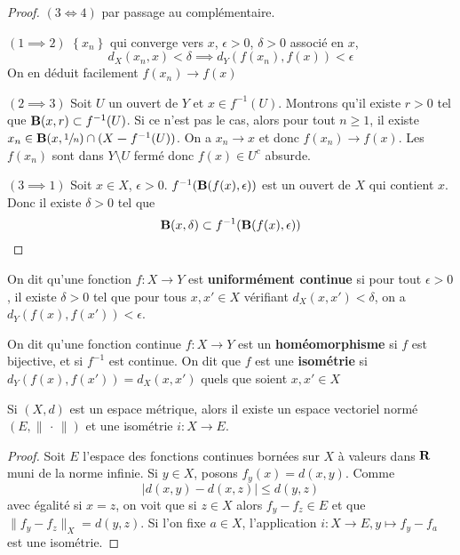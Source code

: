 \begin{proof}
    $(3 \iff  4)$ par passage au complémentaire.

    $(1 \implies 2)$  $ \left\{ x_n \right\} $ qui converge vers $x$,  $\epsilon>0$,  $\delta>0$ associé en  $x$,  \[
        d_X(x_n, x)<\delta \implies  d_Y(f(x_n), f(x))<\epsilon
    \] 
    On en déduit facilement $f(x_n)\longrightarrow f(x)$

    $(2 \implies 3)$ Soit $U$ un ouvert de  $Y$ et  $x \in  f^{-1}(U)$. Montrons qu'il existe $r>0$ tel que  $\mathbf B(x, r)\subset f^{-1}(U)$. Si ce n'est pas le cas, alors pour tout $n\geq 1$, il existe $x_n \in  \mathbf B(x, \sfrac 1n)\cap (X\bm- f^{-1} (U))$. On a $x_n \to  x$ et donc $f(x_n) \to  f(x)$. Les $f(x_n)$ sont dans  $Y\setminus U$ fermé donc $f(x) \in  U^c$ absurde.

    $(3 \implies 1)$ Soit $x \in  X$, $\epsilon>0$. $f^{-1}(\mathbf B(f(x), \epsilon))$ est un ouvert de $X$ qui contient  $x$. Donc il existe  $\delta>0$ tel que  \[
        \mathbf B(x, \delta) \subset f^{-1}(\mathbf B(f(x), \epsilon))
    \] 
\end{proof}

\begin{dfn}
    On dit qu'une fonction $f: X \rightarrow Y$ est \textbf{uniformément continue} si pour tout $\epsilon>0$, il existe $\delta>0$ tel que pour tous $x, x' \in X$ vérifiant $d_{X}\left(x, x'\right)<\delta$, on a $d_{Y}\left(f(x), f\left(x'\right)\right)<\epsilon$.

    On dit qu'une fonction continue $f: X \rightarrow Y$ est un \textbf{homéomorphisme}  si $f$ est bijective, et si $f^{-1}$ est continue. On dit que $f$ est une \textbf{isométrie}  si $d_{Y}\left(f(x), f\left(x'\right)\right)=d_{X}\left(x, x'\right)$ quels que soient $x, x' \in X$
\end{dfn}

\begin{thm}
    Si $(X, d)$ est un espace métrique, alors il existe un espace vectoriel normé  $(E, \|\,\cdot\,\|)$ et une isométrie $i:X\longrightarrow E$.
\end{thm}

\begin{proof}
    Soit $E$ l'espace des fonctions continues bornées sur  $X$ à valeurs dans  $\mathbf R$ muni de la norme infinie. Si $y \in  X$, posons $f_y(x)=d(x, y)$. Comme  \[
        |d(x, y)-d(x, z)|\leq d(y, z)
    \] 
    avec égalité si $x=z$, on voit que si  $z \in  X$ alors $f_y-f_z \in E$ et que $\|f_y-f_z\|_X=d(y, z)$. Si l'on fixe $a \in  X$, l'application $i:X \longrightarrow E, y \longmapsto f_y-f_a$ est une isométrie.
\end{proof}

